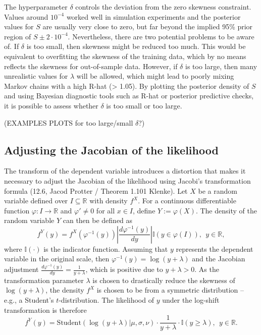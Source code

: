 The hyperparameter $\delta$ controls the deviation from the zero skewness constraint.
Values around $10^{-4}$ worked well in simulation experiments and the posterior values for $S$ are usually very close to zero, but far beyond the implied 95\% prior region of $S \pm 2 \cdot 10^{-4}$.
Nevertheless, there are two potential problems to be aware of.
If $\delta$ is too small, then skewness might be reduced too much.
This would be equivalent to overfitting the skewness of the training data, which by no means reflects the skewness for out-of-sample data.
However, if $\delta$ is too large, then many unrealistic values for $\lambda$ will be allowed, which might lead to poorly mixing Markov chains with a high R-hat (> 1.05).
By plotting the posterior density of $S$ and using Bayesian diagnostic tools such as R-hat or posterior predictive checks, it is possible to assess whether $\delta$ is too small or too large.

(EXAMPLES PLOTS for too large/small $\delta$?)

\subsection{Adjusting the Jacobian of the likelihood}

The transform of the dependent variable introduces a distortion that makes it necessary to adjust the Jacobian of the likelihood using Jacobi's transformation formula (12.6, Jacod Protter / Theorem 1.101 Klenke).
Let $X$ be a random variable defined over $I \subseteq \mathbb{R}$ with density $f^X$. For a continuous differentiable function $\varphi: I \rightarrow \mathbb{R}$ and $\varphi' \ne 0$ for all $x \in I$, define $Y := \varphi(X)$.
The density of the random variable $Y$ can then be defined as
\begin{equation*}
    f^Y(y) = f^X(\varphi^{-1}(y))
    \left|\displaystyle \frac{d \varphi^{-1}(y)}{dy}\right|
    \mathbb{I}(y \in \varphi(I)), ~~ y \in \mathbb{R},
\end{equation*}
where $\mathbb{I}(\cdot)$ is the indicator function.
Assuming that $y$ represents the dependent variable in the original scale, then $\varphi^{-1}(y) = \log(y + \lambda)$ and the Jacobian adjustment $\displaystyle \frac{d \varphi^{-1}(y)}{dy} = \frac{1}{y + \lambda}$, which is positive due to $y + \lambda > 0$. As the transformation parameter $\lambda$ is chosen to drastically reduce the skewness of $\log(y + \lambda)$, the density $f^X$ is chosen to be from a symmetric distribution – e.g., a Student's $t$-distribution. The likelihood of $y$ under the log-shift transformation is therefore
\begin{equation}
    \displaystyle f^Y(y) = \text{Student}(\log(y + \lambda)| \mu , \sigma, \nu)
    \cdot \frac{1}{y + \lambda}
    \cdot\mathbb{I}(y \ge \lambda), ~~ y \in \mathbb{R}.
\end{equation}

